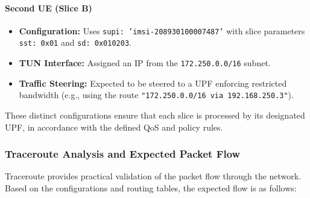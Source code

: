 \paragraph{Second UE (Slice B)}
\begin{itemize}
    \item \textbf{Configuration:} Uses \texttt{supi: 'imsi-208930100007487'} with 
    slice parameters \texttt{sst: 0x01} and \texttt{sd: 0x010203}.
    \item \textbf{TUN Interface:} Assigned an IP from the \texttt{172.250.0.0/16} subnet.
    \item \textbf{Traffic Steering:} Expected to be steered to a UPF enforcing 
    restricted bandwidth (e.g., using the route 
    \texttt{"172.250.0.0/16 via 192.168.250.3"}).

\end{itemize}

These distinct configurations ensure that each slice is processed by its 
designated UPF, in accordance with the defined QoS and policy rules.

\subsubsection{Traceroute Analysis and Expected Packet Flow}
\label{subsec:traceroute-analysis}

Traceroute provides practical validation of the packet flow through the network. 
Based on the configurations and routing tables, the expected flow is as follows:

